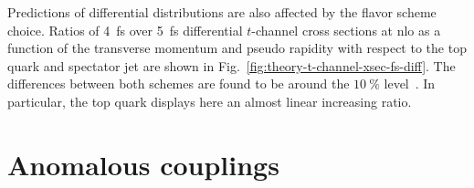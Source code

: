 Predictions of differential distributions are also affected by the flavor scheme choice. Ratios of 4~\gls{fs} over 5~\gls{fs} differential $t$-channel cross sections at \gls{nlo} as a function of the transverse momentum and pseudo rapidity with respect to the top quark and spectator jet are shown in Fig.~\ref{fig:theory-t-channel-xsec-fs-diff}. The differences between both schemes are found to be around the $10~\%$ level~\cite{Campbell:2009ss}. In particular, the top quark \pt displays here an almost linear increasing ratio.



\section{Anomalous couplings}
\label{sec:theory-anomalous-couplings}


